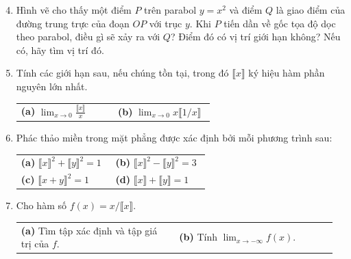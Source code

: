 \begin{minipage}[t]{0.73\textwidth}
  \vspace{0pt}
  \begin{enumerate}[label=\textbf{\arabic*.}, leftmargin=1.4em, itemsep=7pt, topsep=0pt, parsep=0pt]
    \setcounter{enumi}{3}

    \item Hình vẽ cho thấy một điểm $P$ trên parabol $y = x^2$ và điểm $Q$ là giao điểm của đường trung trực của đoạn $OP$ với trục $y$. Khi $P$ tiến dần về gốc tọa độ dọc theo parabol, điều gì sẽ xảy ra với $Q$? Điểm đó có vị trí giới hạn không? Nếu có, hãy tìm vị trí đó.

    \item Tính các giới hạn sau, nếu chúng tồn tại, trong đó $\llbracket x \rrbracket$ ký hiệu hàm phần nguyên lớn nhất.
    \vspace{2pt}
    
    \noindent
    \begin{tabular}{@{}p{0.48\linewidth}p{0.48\linewidth}@{}}
      \textbf{(a)} $\displaystyle \lim_{x \to 0} \frac{\llbracket x \rrbracket}{x}$ &
      \textbf{(b)} $\displaystyle \lim_{x \to 0} x \llbracket 1/x \rrbracket$
    \end{tabular}

    \item Phác thảo miền trong mặt phẳng được xác định bởi mỗi phương trình sau:
    \vspace{2pt}
    
    \noindent
    \begin{tabular}{@{}p{0.48\linewidth}p{0.48\linewidth}@{}}
      \textbf{(a)} $\llbracket x \rrbracket^2 + \llbracket y \rrbracket^2 = 1$ &
      \textbf{(b)} $\llbracket x \rrbracket^2 - \llbracket y \rrbracket^2 = 3$ \\[4pt]
      \textbf{(c)} $\llbracket x + y \rrbracket^2 = 1$ &
      \textbf{(d)} $\llbracket x \rrbracket + \llbracket y \rrbracket = 1$
    \end{tabular}

    \item Cho hàm số $f(x) = x/\llbracket x \rrbracket$.
    \vspace{2pt}
    
    \noindent
    \begin{tabular}{@{}p{0.48\linewidth}p{0.48\linewidth}@{}}
      \textbf{(a)} Tìm tập xác định và tập giá trị của $f$. &
      \textbf{(b)} Tính $\displaystyle \lim_{x \to -\infty} f(x)$.
    \end{tabular}


\end{enumerate}
\end{minipage}
